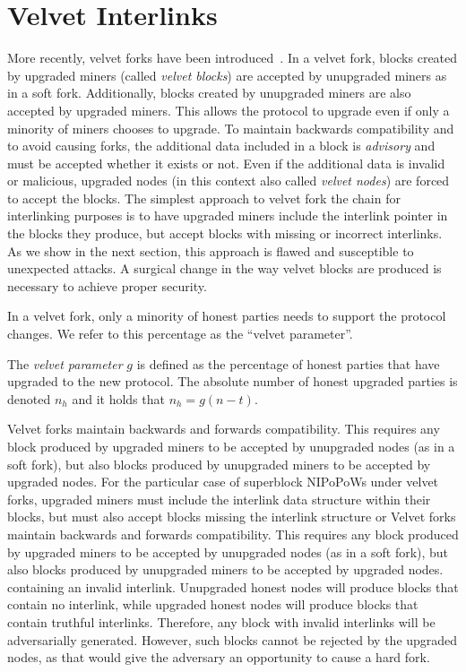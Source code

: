 \section{Velvet Interlinks}
More recently, velvet forks have been introduced~\cite{velvet}. In a
velvet fork, blocks created by upgraded miners (called \emph{velvet blocks}) are
accepted by unupgraded miners as in a soft fork. Additionally, blocks created by
unupgraded miners are also accepted by upgraded miners. This allows the protocol
to upgrade even if only a minority of miners chooses to upgrade. To maintain
backwards compatibility and to avoid causing forks, the additional data included
in a block is \emph{advisory} and must be accepted whether it exists or not.
Even if the additional data is invalid or malicious, upgraded nodes (in this
context also called \emph{velvet nodes}) are forced to accept the blocks. The
simplest approach to velvet fork the chain for interlinking purposes is to have
upgraded miners include the interlink pointer in the blocks they produce, but
accept blocks with missing or incorrect interlinks. As we show in the next
section, this approach is flawed and susceptible to unexpected attacks. A
surgical change in the way velvet blocks are produced is necessary to achieve
proper security.

In a velvet fork, only a minority of honest parties needs to support the protocol
changes. We refer to this percentage as the ``velvet parameter''.

\begin{definition}
	The \emph{velvet parameter} $g$ is defined as the percentage of honest parties
	that have upgraded to the new protocol. The absolute number of honest upgraded
	parties is denoted $n_h$ and it holds that
	$n_h = g (n - t)$.
	\label{defn:velvet_honest_majority}
\end{definition}

Velvet forks maintain backwards and forwards compatibility. This requires any
block produced by upgraded miners to be accepted by unupgraded nodes (as in a
soft fork), but also blocks produced by unupgraded miners to be accepted by
upgraded nodes. For the particular case of superblock NIPoPoWs under velvet
forks, upgraded miners must include the interlink data structure within their
blocks, but must also accept blocks missing the interlink structure or
Velvet forks maintain backwards and forwards compatibility. This requires any
block produced by upgraded miners to be accepted by unupgraded nodes (as in a
soft fork), but also blocks produced by unupgraded miners to be accepted by
upgraded nodes.
containing an invalid interlink. Unupgraded honest nodes will produce blocks
that contain no interlink, while upgraded honest nodes will produce blocks that
contain truthful interlinks. Therefore, any block with invalid interlinks will
be adversarially generated. However, such blocks cannot be rejected by the
upgraded nodes, as that would give the adversary an opportunity to cause a hard
fork.

